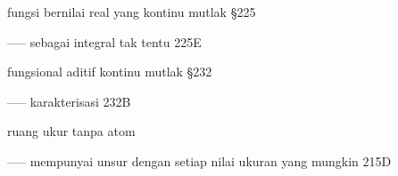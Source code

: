 \indexmedskip

 fungsi bernilai real yang kontinu mutlak \S225

----- sebagai integral tak tentu 225E

fungsional aditif kontinu mutlak \S232

----- karakterisasi 232B
































































 ruang ukur tanpa atom

----- mempunyai unsur dengan setiap nilai ukuran yang mungkin 215D

















